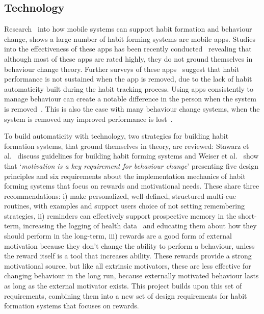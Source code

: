 \subsection{Technology}
Research~\cite{survey_on_apps_2,survey_on_current_apps_of_steel} into how mobile systems can support habit formation and behaviour change, shows a large number of habit forming systems are mobile apps. Studies into the effectiveness of these apps has been recently conducted~\cite{article_beyond_self_tracking_designing_apps, article_dont_kick_habit} revealing that although most of these apps are rated highly, they do not ground themselves in behaviour change theory. Further surveys of these apps~\cite{survey_on_current_apps_of_steel,survey_on_apps_2} suggest that habit performance is not sustained when the app is removed, due to the lack of habit automaticity built during the habit tracking process. Using apps consistently to manage behaviour can create a notable difference in the person when the system is removed~\cite{article_my_phone_is_part_of_my_soul}. This is also the case with many behaviour change systems, when the system is removed any improved performance is lost~\cite{article_dont_kick_habit, article_realtime_feedback_improving_medication_taking}.


To build automaticity with technology, two strategies for building habit formation systems, that ground themselves in theory, are reviewed: Stawarz et al.~\cite{article_beyond_self_tracking_designing_apps} discuss guidelines for building habit forming systems and Weiser et al.~\cite{article_taxonomy_motivational_affordances_meaningful} show that `\textit{motivation is a key requirement for behaviour change}' presenting five design principles and six requirements about the implementation mechanics of habit forming systems that focus on rewards and motivational needs. These share three recommendations: i) make personalized, well-defined, structured multi-cue routines, with examples and support users choice of not setting remembering strategies, ii) reminders can effectively support prospective memory in the short-term, increasing the logging of health data~\cite{the_power_of_logging_mobile_notifications} and educating them about how they should perform in the long-term, iii) rewards are a good form of external motivation because they don't change the ability to perform a behaviour, unless the reward itself is a tool that increases ability. These rewards provide a strong motivational source, but like all extrinsic motivators, these are less effective for changing behaviour in the long run, because externally motivated behaviour lasts as long as the external motivator exists. This project builds upon this set of requirements, combining them into a new set of design requirements for habit formation systems that focuses on rewards.

